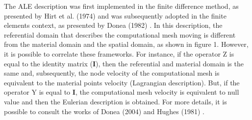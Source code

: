 \medskip
The ALE description was first implemented in the finite difference
 method, as presented by Hirt et al. (1974) \cite{hirt1974} 
and was subsequently adopted in the finite elements context, 
as presented by Donea (1982) \cite{donea1982}. In this description, 
the referential domain that describes the computational mesh moving 
is different from the material domain and the spatial domain, 
as shown in figure 1. However, it is possible to correlate these 
frameworks. For instance, if the operator Z is equal to the 
identity matrix (\textbf{I}), then the referential and material domain 
is the same and, subsequently, the node velocity of the 
computational mesh 
is equivalent to the material points velocity (Lagrangian description). 
But, if the operator Y is equal to \textbf{I}, the computational mesh
velocity is equivalent to null value and then the Eulerian description is
obtained. For more details, it is possible to consult the works 
of Donea (2004) \cite{donea2004} and Hughes (1981) \cite{hughes1981}.

%
%
%
%
%
